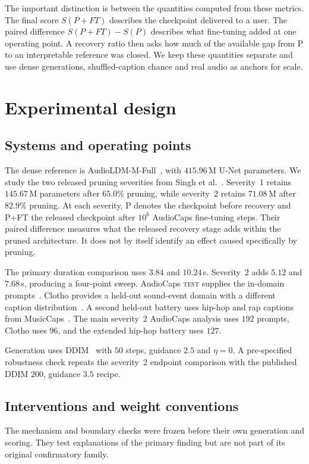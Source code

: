 \documentclass{article}
\newcommand{\PFT}{P{+}FT}
\begin{document}
The important distinction is between the quantities computed from these metrics. The final score $S(\PFT)$ describes the checkpoint delivered to a user. The paired difference $S(\PFT)-S(P)$ describes what fine-tuning added at one operating point. A recovery ratio then asks how much of the available gap from P to an interpretable reference was closed. We keep these quantities separate and use dense generations, shuffled-caption chance and real audio as anchors for scale.
\section{Experimental design}
\subsection{Systems and operating points}
The dense reference is AudioLDM-M-Full~\cite{liu2023audioldm}, with $415.96$\,M U-Net parameters. We study the two released pruning severities from Singh et al.~\cite{singh2026pruning}. Severity~1 retains $145.67$\,M parameters after $65.0\%$ pruning, while severity~2 retains $71.08$\,M after $82.9\%$ pruning. At each severity, P denotes the checkpoint before recovery and \PFT{} the released checkpoint after $10^{6}$ AudioCaps fine-tuning steps. Their paired difference measures what the released recovery stage adds within the pruned architecture. It does not by itself identify an effect caused specifically by pruning.

The primary duration comparison uses $3.84$ and $10.24$\,s. Severity~2 adds $5.12$ and $7.68$\,s, producing a four-point sweep. AudioCaps \textsc{test} supplies the in-domain prompts~\cite{kim2019audiocaps}. Clotho provides a held-out sound-event domain with a different caption distribution~\cite{drossos2020clotho}. A second held-out battery uses hip-hop and rap captions from MusicCaps~\cite{agostinelli2023musiclm}. The main severity~2 AudioCaps analysis uses $192$ prompts, Clotho uses $96$, and the extended hip-hop battery uses $127$.

Generation uses DDIM~\cite{song2021ddim} with $50$ steps, guidance $2.5$ and $\eta=0$. A pre-specified robustness check repeats the severity~2 endpoint comparison with the published DDIM $200$, guidance $3.5$ recipe.

\subsection{Interventions and weight conventions}
The mechanism and boundary checks were frozen before their own generation and scoring. They test explanations of the primary finding but are not part of its original confirmatory family.
\end{document}
